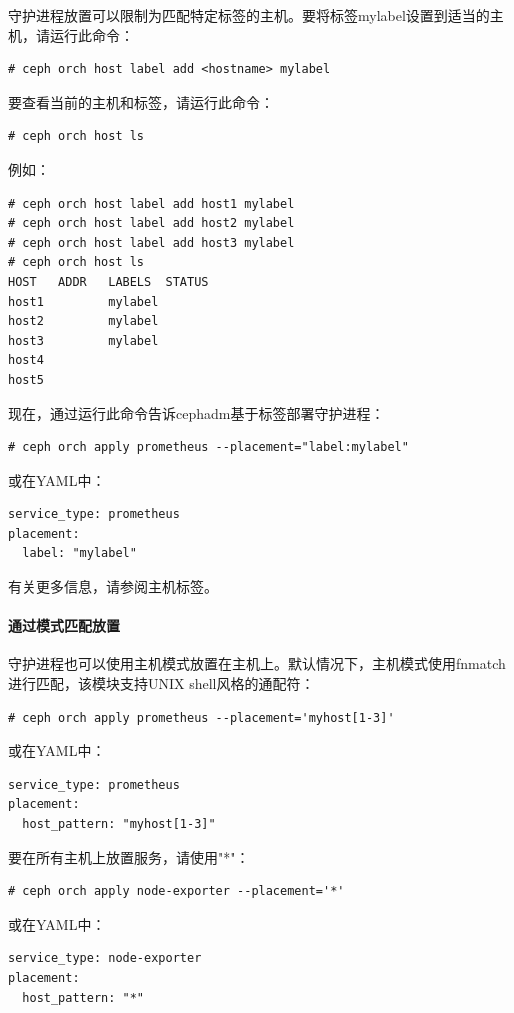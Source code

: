 \documentclass[12pt,UTF8]{ctexbook}
\begin{document}
守护进程放置可以限制为匹配特定标签的主机。要将标签mylabel设置到适当的主机，请运行此命令：
\begin{verbatim}
# ceph orch host label add <hostname> mylabel
\end{verbatim}

要查看当前的主机和标签，请运行此命令：
\begin{verbatim}
# ceph orch host ls
\end{verbatim}

例如：
\begin{verbatim}
# ceph orch host label add host1 mylabel
# ceph orch host label add host2 mylabel
# ceph orch host label add host3 mylabel
# ceph orch host ls
HOST   ADDR   LABELS  STATUS
host1         mylabel
host2         mylabel
host3         mylabel
host4
host5
\end{verbatim}

现在，通过运行此命令告诉cephadm基于标签部署守护进程：
\begin{verbatim}
# ceph orch apply prometheus --placement="label:mylabel"
\end{verbatim}

或在YAML中：
\begin{verbatim}
service_type: prometheus
placement:
  label: "mylabel"
\end{verbatim}

有关更多信息，请参阅主机标签。

\paragraph{通过模式匹配放置}

守护进程也可以使用主机模式放置在主机上。默认情况下，主机模式使用fnmatch进行匹配，该模块支持UNIX shell风格的通配符：
\begin{verbatim}
# ceph orch apply prometheus --placement='myhost[1-3]'
\end{verbatim}

或在YAML中：
\begin{verbatim}
service_type: prometheus
placement:
  host_pattern: "myhost[1-3]"
\end{verbatim}

要在所有主机上放置服务，请使用"*"：
\begin{verbatim}
# ceph orch apply node-exporter --placement='*'
\end{verbatim}

或在YAML中：
\begin{verbatim}
service_type: node-exporter
placement:
  host_pattern: "*"
\end{verbatim}
\end{document}
